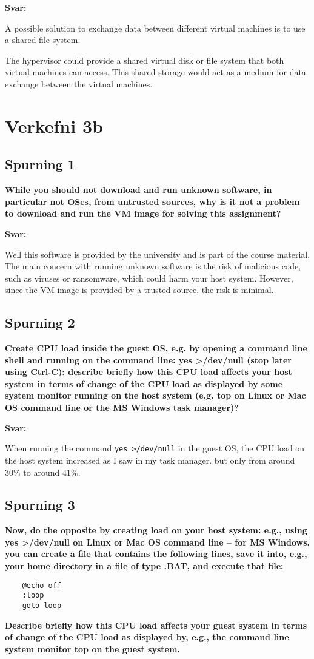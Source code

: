 \documentclass{article}
\newcommand{\sv}{\textbf{Svar:}}
\newcommand{\bo}[1]{\textbf{#1}}
\begin{document}
\sv



A possible solution to exchange data between different virtual machines is to use a shared file system.

The hypervisor could provide a shared virtual disk or file system that both 
virtual machines can access. This shared storage would act as a medium 
for data exchange between the virtual machines.


\section{Verkefni 3b}
\subsection{Spurning 1}
\bo{While you should not download and run unknown software, in particular not OSes,
from untrusted sources, why is it not a problem to download and run the VM image for
solving this assignment?}

\sv


Well this software is provided by the university and is part of the course material. 
The main concern with running unknown software is the risk of malicious code, 
such as viruses or ransomware, which could harm your host system. 
However, since the VM image is provided by a trusted source, the risk is minimal.


\subsection{Spurning 2}
\bo{Create CPU load inside the guest OS, e.g. by opening a command line shell and running
on the command line: yes >/dev/null (stop later using Ctrl-C): describe briefly how
this CPU load affects your host system in terms of change of the CPU load as displayed
by some system monitor running on the host system (e.g. top on Linux or Mac OS
command line or the MS Windows task manager)?}


\sv


When running the command \texttt{yes >/dev/null} in the guest OS, the CPU load on the host system increased as I saw in my task manager.
but only from around $30\%$ to around $41\%$.


\subsection{Spurning 3}
\bo{Now, do the opposite by creating load on your host system: e.g., using yes >/dev/null
on Linux or Mac OS command line – for MS Windows, you can create a file that
contains the following lines, save it into, e.g., your home directory in a file of type .BAT,
and execute that file:
}
\begin{verbatim}
    @echo off
    :loop
    goto loop 
\end{verbatim}
\bo{
Describe briefly how this CPU load affects your guest system in terms of change of the
CPU load as displayed by, e.g., the command line system monitor top on the guest
system.}
\end{document}

